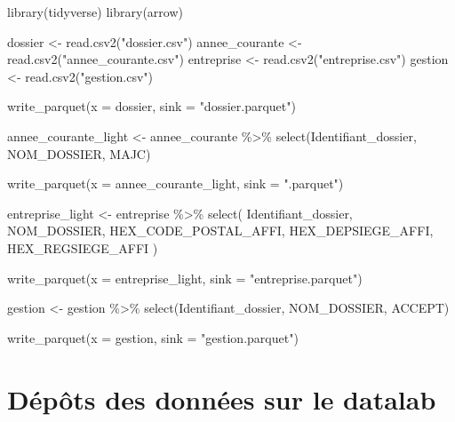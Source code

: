 \documentclass[
  letterpaper,
  DIV=11,
  numbers=noendperiod]{scrreprt}
\newenvironment{Shaded}{\begin{snugshade}}{\end{snugshade}}
\newcommand{\AttributeTok}[1]{\textcolor[rgb]{0.40,0.45,0.13}{#1}}
\newcommand{\FunctionTok}[1]{\textcolor[rgb]{0.28,0.35,0.67}{#1}}
\newcommand{\NormalTok}[1]{\textcolor[rgb]{0.00,0.23,0.31}{#1}}
\newcommand{\OtherTok}[1]{\textcolor[rgb]{0.00,0.23,0.31}{#1}}
\newcommand{\SpecialCharTok}[1]{\textcolor[rgb]{0.37,0.37,0.37}{#1}}
\newcommand{\StringTok}[1]{\textcolor[rgb]{0.13,0.47,0.30}{#1}}
\begin{document}
\begin{Shaded}
\begin{Highlighting}[]
\FunctionTok{library}\NormalTok{(tidyverse)}
\FunctionTok{library}\NormalTok{(arrow)}

\NormalTok{dossier }\OtherTok{\textless{}{-}} \FunctionTok{read.csv2}\NormalTok{(}\StringTok{"dossier.csv"}\NormalTok{)}
\NormalTok{annee\_courante }\OtherTok{\textless{}{-}} \FunctionTok{read.csv2}\NormalTok{(}\StringTok{"annee\_courante.csv"}\NormalTok{)}
\NormalTok{entreprise }\OtherTok{\textless{}{-}} \FunctionTok{read.csv2}\NormalTok{(}\StringTok{"entreprise.csv"}\NormalTok{)}
\NormalTok{gestion }\OtherTok{\textless{}{-}} \FunctionTok{read.csv2}\NormalTok{(}\StringTok{"gestion.csv"}\NormalTok{)}

\FunctionTok{write\_parquet}\NormalTok{(}\AttributeTok{x =}\NormalTok{ dossier, }\AttributeTok{sink =} \StringTok{"dossier.parquet"}\NormalTok{)}

\NormalTok{annee\_courante\_light }\OtherTok{\textless{}{-}}\NormalTok{ annee\_courante }\SpecialCharTok{\%\textgreater{}\%}
  \FunctionTok{select}\NormalTok{(Identifiant\_dossier, NOM\_DOSSIER, MAJC)}

\FunctionTok{write\_parquet}\NormalTok{(}\AttributeTok{x =}\NormalTok{ annee\_courante\_light, }\AttributeTok{sink =} \StringTok{".parquet"}\NormalTok{)}

\NormalTok{entreprise\_light }\OtherTok{\textless{}{-}}\NormalTok{ entreprise }\SpecialCharTok{\%\textgreater{}\%}
  \FunctionTok{select}\NormalTok{(}
\NormalTok{    Identifiant\_dossier,}
\NormalTok{    NOM\_DOSSIER,}
\NormalTok{    HEX\_CODE\_POSTAL\_AFFI,}
\NormalTok{    HEX\_DEPSIEGE\_AFFI,}
\NormalTok{    HEX\_REGSIEGE\_AFFI}
\NormalTok{  )}

\FunctionTok{write\_parquet}\NormalTok{(}\AttributeTok{x =}\NormalTok{ entreprise\_light, }\AttributeTok{sink =} \StringTok{"entreprise.parquet"}\NormalTok{)}

\NormalTok{gestion }\OtherTok{\textless{}{-}}\NormalTok{ gestion }\SpecialCharTok{\%\textgreater{}\%}
  \FunctionTok{select}\NormalTok{(Identifiant\_dossier, }
\NormalTok{         NOM\_DOSSIER, }
\NormalTok{         ACCEPT)}

\FunctionTok{write\_parquet}\NormalTok{(}\AttributeTok{x =}\NormalTok{ gestion, }\AttributeTok{sink =} \StringTok{"gestion.parquet"}\NormalTok{)}
\end{Highlighting}
\end{Shaded}

\hypertarget{duxe9puxf4ts-des-donnuxe9es-sur-le-datalab}{%
\section{Dépôts des données sur le
datalab}\label{duxe9puxf4ts-des-donnuxe9es-sur-le-datalab}}
\end{document}
